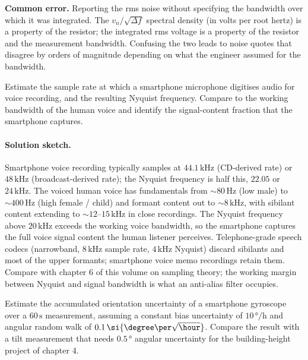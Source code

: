 \textbf{Common error.} Reporting the rms noise without specifying
the bandwidth over which it was integrated. The
$v_{n}/\sqrt{\Delta f}$ spectral density (in volts per root
hertz) is a property of the resistor; the integrated rms voltage
is a property of the resistor and the measurement bandwidth.
Confusing the two leads to noise quotes that disagree by orders
of magnitude depending on what the engineer assumed for the
bandwidth.

\begin{exercise}
Estimate the sample rate at which a smartphone microphone digitises
audio for voice recording, and the resulting Nyquist frequency.
Compare to the working bandwidth of the human voice and identify
the signal-content fraction that the smartphone captures.
\end{exercise}

\paragraph{Solution sketch.} Smartphone voice recording typically
samples at $44.1 \,\si{\kilo\hertz}$ (CD-derived rate) or
$48 \,\si{\kilo\hertz}$ (broadcast-derived rate); the Nyquist
frequency is half this, $22.05$ or $24 \,\si{\kilo\hertz}$. The
voiced human voice has fundamentals from $\sim 80 \,\si{\hertz}$
(low male) to $\sim 400 \,\si{\hertz}$ (high female / child) and
formant content out to $\sim 8 \,\si{\kilo\hertz}$, with sibilant
content extending to $\sim 12$--$15 \,\si{\kilo\hertz}$ in close
recordings. The Nyquist frequency above $20 \,\si{\kilo\hertz}$
exceeds the working voice bandwidth, so the smartphone captures
the full voice signal content the human listener perceives. Telephone-grade speech codecs
(narrowband, $8 \,\si{\kilo\hertz}$ sample rate, $4 \,\si{\kilo
\hertz}$ Nyquist) discard sibilants and most of the upper
formants; smartphone voice memo recordings retain them. Compare
with chapter 6 of this volume on sampling theory; the working
margin between Nyquist and signal bandwidth is what an anti-alias
filter occupies.

\begin{exercise}
Estimate the accumulated orientation uncertainty of a smartphone
gyroscope over a $60 \,\si{\second}$ measurement, assuming a
constant bias uncertainty of $10 \,\si{\degree\per\hour}$ and
angular random walk of $0.1 \,\si{\degree\per\sqrt{\hour}}$.
Compare the result with a tilt measurement that needs
$0.5 \,\si{\degree}$ angular uncertainty for the building-height
project of chapter 4.
\end{exercise}

